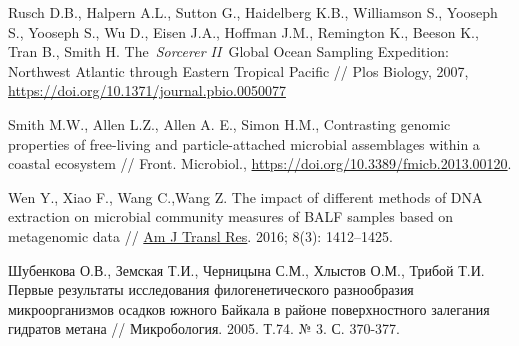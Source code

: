 \documentclass[a4paper,12pt,openany,final]{extreport}
\begin{document}
Rusch D.B., Halpern A.L., Sutton G., Haidelberg K.B., Williamson S.,
Yooseph S., Yooseph S., Wu D., Eisen J.A., Hoffman J.M., Remington K.,
Beeson K., Tran B., Smith H. The~\emph{Sorcerer II}~Global Ocean
Sampling Expedition: Northwest Atlantic through Eastern Tropical Pacific
// Plos Biology, 2007,
\url{https://doi.org/10.1371/journal.pbio.0050077}

Smith M.W., Allen L.Z., Allen A. E., Simon H.M., Contrasting genomic
properties of free-living and particle-attached microbial assemblages
within a coastal ecosystem // Front. Microbiol.,
\url{https://doi.org/10.3389/fmicb.2013.00120}.

Wen Y., Xiao F., Wang C.,Wang Z. The impact of different methods of DNA
extraction on microbial community measures of BALF samples based on
metagenomic data //
\href{https://www.ncbi.nlm.nih.gov/pmc/articles/PMC4858570/}{Am J Transl
Res}. 2016; 8(3): 1412--1425.

\protect\hypertarget{h1}{}{}Шубенкова О.В., Земская Т.И., Черницына
С.М., Хлыстов О.М., Трибой Т.И. Первые результаты исследования
филогенетического разнообразия микроорганизмов осадков южного Байкала в
районе поверхностного залегания гидратов метана // Микробология. 2005.
Т.74. № 3. С. 370-377.
\end{document}
